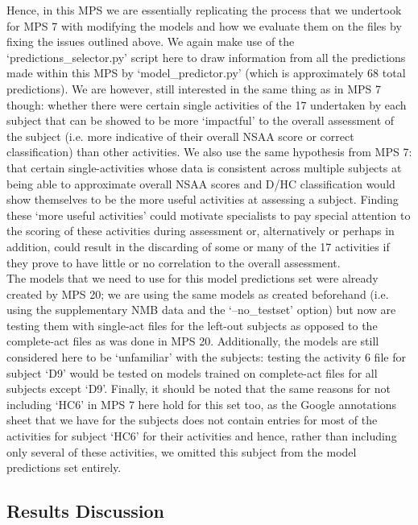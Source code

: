 \documentclass[12pt,twoside]{report}
\begin{document}
\quad Hence, in this MPS we are essentially replicating the process that we undertook for MPS 7 with modifying the models and how we evaluate them on the files by fixing the issues outlined above. We again make use of the ‘predictions\_selector.py’ script here to draw information from all the predictions made within this MPS by ‘model\_predictor.py’ (which is approximately 68 total predictions). We are however, still interested in the same thing as in MPS 7 though: whether there were certain single activities of the 17 undertaken by each subject that can be showed to be more ‘impactful’ to the overall assessment of the subject (i.e. more indicative of their overall NSAA score or correct classification) than other activities. We also use the same hypothesis from MPS 7: that certain single-activities whose data is consistent across multiple subjects at being able to approximate overall NSAA scores and D/HC classification would show themselves to be the more useful activities at assessing a subject. Finding these ‘more useful activities’ could motivate specialists to pay special attention to the scoring of these activities during assessment or, alternatively or perhaps in addition, could result in the discarding of some or many of the 17 activities if they prove to have little or no correlation to the overall assessment.\\

\quad The models that we need to use for this model predictions set were already created by MPS 20; we are using the same models as created beforehand (i.e. using the supplementary NMB data and the ‘--no\_testset’ option) but now are testing them with single-act files for the left-out subjects as opposed to the complete-act files as was done in MPS 20. Additionally, the models are still considered here to be ‘unfamiliar’ with the subjects: testing the activity 6 file for subject ‘D9’ would be tested on models trained on complete-act files for all subjects except ‘D9’. Finally, it should be noted that the same reasons for not including ‘HC6’ in MPS 7 here hold for this set too, as the Google annotations sheet that we have for the subjects does not contain entries for most of the activities for subject ‘HC6’ for their activities and hence, rather than including only several of these activities, we omitted this subject from the model predictions set entirely.


\subsection{Results Discussion}
\end{document}
